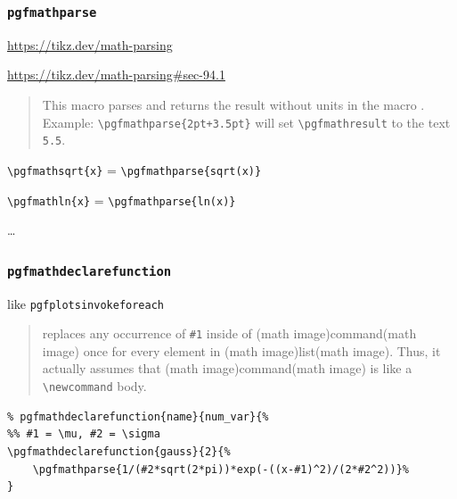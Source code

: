 \documentclass[
]{book}
\theoremstyle{definition}
\theoremstyle{definition}
\theoremstyle{definition}
\theoremstyle{definition}
\theoremstyle{remark}
\begin{document}
\hypertarget{pgfmathparse}{%
\subsubsection{\texorpdfstring{\texttt{pgfmathparse}}{pgfmathparse}}\label{pgfmathparse}}

\url{https://tikz.dev/math-parsing}

\url{https://tikz.dev/math-parsing\#sec-94.1}

\begin{quote}
This macro parses and returns the result without units in the macro \pgfmathresult.
Example: \texttt{\textbackslash{}pgfmathparse\{2pt+3.5pt\}} will set \texttt{\textbackslash{}pgfmathresult} to the text \texttt{5.5}.
\end{quote}

\texttt{\textbackslash{}pgfmathsqrt\{x\}} = \texttt{\textbackslash{}pgfmathparse\{sqrt(x)\}}

\texttt{\textbackslash{}pgfmathln\{x\}} = \texttt{\textbackslash{}pgfmathparse\{ln(x)\}}

\ldots{}

\hypertarget{pgfmathdeclarefunction}{%
\subsubsection{\texorpdfstring{\texttt{pgfmathdeclarefunction}}{pgfmathdeclarefunction}}\label{pgfmathdeclarefunction}}

like \texttt{pgfplotsinvokeforeach}

\begin{quote}
replaces any occurrence of \texttt{\#1} inside of (math image)command(math image) once for every element in (math image)list(math image). Thus, it actually assumes that (math image)command(math image) is like a \texttt{\textbackslash{}newcommand} body.
\end{quote}

\begin{verbatim}
% pgfmathdeclarefunction{name}{num_var}{%
%% #1 = \mu, #2 = \sigma
\pgfmathdeclarefunction{gauss}{2}{%
    \pgfmathparse{1/(#2*sqrt(2*pi))*exp(-((x-#1)^2)/(2*#2^2))}%
}
\end{verbatim}
\end{document}
